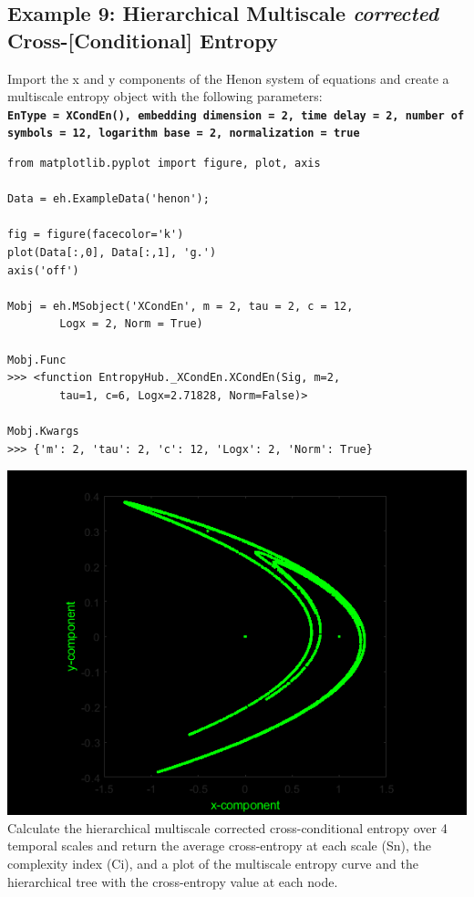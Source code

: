 \documentclass[12pt, a4paper, titlepage, openany]{book}
\begin{document}
\subsection{\normalsize Example 9: \hspace{15mm} Hierarchical Multiscale \emph{corrected} Cross-[Conditional] Entropy}
\noindent Import the x and y components of the Henon system of equations and create a multiscale entropy object with the following parameters:\\
\texttt{\textbf{EnType =  XCondEn(), embedding dimension = 2, time delay = 2, number of symbols = 12, logarithm base = 2, normalization = true}}
\begin{verbatim}
from matplotlib.pyplot import figure, plot, axis

Data = eh.ExampleData('henon');

fig = figure(facecolor='k')
plot(Data[:,0], Data[:,1], 'g.')
axis('off')

Mobj = eh.MSobject('XCondEn', m = 2, tau = 2, c = 12, 
		Logx = 2, Norm = True)

Mobj.Func
>>> <function EntropyHub._XCondEn.XCondEn(Sig, m=2, 
		tau=1, c=6, Logx=2.71828, Norm=False)>

Mobj.Kwargs
>>> {'m': 2, 'tau': 2, 'c': 12, 'Logx': 2, 'Norm': True}

\end{verbatim}
\includegraphics[scale=.5]{henon.png}\newline \newline
Calculate the hierarchical multiscale corrected cross-conditional entropy over 4 temporal scales and return the average cross-entropy at each scale (Sn), the complexity index (Ci), and a plot of the multiscale entropy curve and the hierarchical tree with the cross-entropy value at each node.
\end{document}
